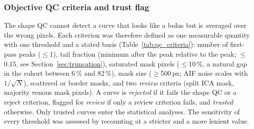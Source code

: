 \subsubsection{Objective QC criteria and trust flag}
The shape QC cannot detect a curve that looks like a bolus but is averaged over the wrong pixels. Each
criterion was therefore defined as one measurable quantity with one threshold and a stated basis
(Table~\ref{tab:qc_criteria}): number of first-pass peaks ($\leq$1), tail fraction (minimum after the peak
relative to the peak; $\leq$0.15, see Section~\ref{sec:truncation}), saturated mask pixels ($\leq$10\,\%, a natural gap in the cohort between 6\,\% and
82\,\%), mask size ($\geq$500\,px; AIF noise scales with $1/\sqrt{N}$), scattered or border masks, and two
\emph{review} criteria (split ICA mask, majority venous mask pixels). A curve is \emph{rejected} if it fails
the shape QC or a reject criterion, flagged for \emph{review} if only a review criterion fails, and
\emph{trusted} otherwise. Only trusted curves enter the statistical analyses. The sensitivity of every
threshold was assessed by recounting at a stricter and a more lenient value.

